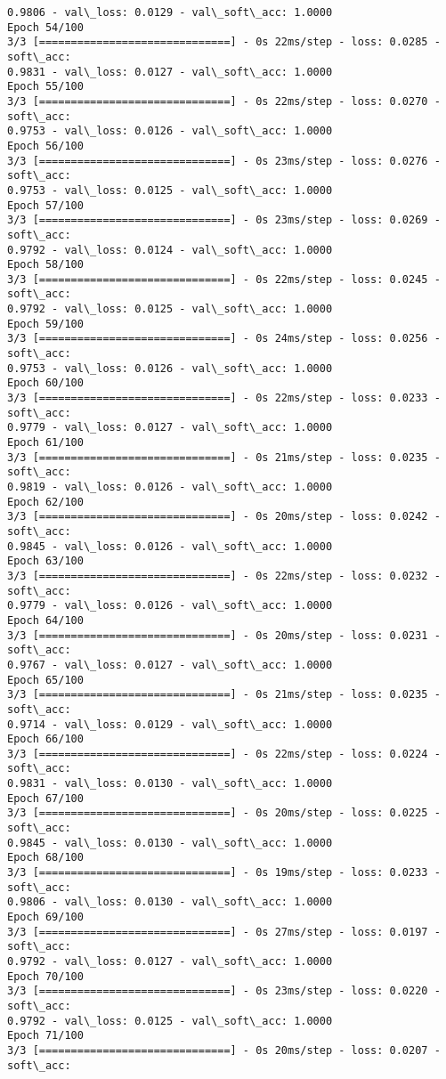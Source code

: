 \documentclass[11pt]{article}
\begin{document}
\begin{Verbatim}[commandchars=\\\{\}]
0.9806 - val\_loss: 0.0129 - val\_soft\_acc: 1.0000
Epoch 54/100
3/3 [==============================] - 0s 22ms/step - loss: 0.0285 - soft\_acc:
0.9831 - val\_loss: 0.0127 - val\_soft\_acc: 1.0000
Epoch 55/100
3/3 [==============================] - 0s 22ms/step - loss: 0.0270 - soft\_acc:
0.9753 - val\_loss: 0.0126 - val\_soft\_acc: 1.0000
Epoch 56/100
3/3 [==============================] - 0s 23ms/step - loss: 0.0276 - soft\_acc:
0.9753 - val\_loss: 0.0125 - val\_soft\_acc: 1.0000
Epoch 57/100
3/3 [==============================] - 0s 23ms/step - loss: 0.0269 - soft\_acc:
0.9792 - val\_loss: 0.0124 - val\_soft\_acc: 1.0000
Epoch 58/100
3/3 [==============================] - 0s 22ms/step - loss: 0.0245 - soft\_acc:
0.9792 - val\_loss: 0.0125 - val\_soft\_acc: 1.0000
Epoch 59/100
3/3 [==============================] - 0s 24ms/step - loss: 0.0256 - soft\_acc:
0.9753 - val\_loss: 0.0126 - val\_soft\_acc: 1.0000
Epoch 60/100
3/3 [==============================] - 0s 22ms/step - loss: 0.0233 - soft\_acc:
0.9779 - val\_loss: 0.0127 - val\_soft\_acc: 1.0000
Epoch 61/100
3/3 [==============================] - 0s 21ms/step - loss: 0.0235 - soft\_acc:
0.9819 - val\_loss: 0.0126 - val\_soft\_acc: 1.0000
Epoch 62/100
3/3 [==============================] - 0s 20ms/step - loss: 0.0242 - soft\_acc:
0.9845 - val\_loss: 0.0126 - val\_soft\_acc: 1.0000
Epoch 63/100
3/3 [==============================] - 0s 22ms/step - loss: 0.0232 - soft\_acc:
0.9779 - val\_loss: 0.0126 - val\_soft\_acc: 1.0000
Epoch 64/100
3/3 [==============================] - 0s 20ms/step - loss: 0.0231 - soft\_acc:
0.9767 - val\_loss: 0.0127 - val\_soft\_acc: 1.0000
Epoch 65/100
3/3 [==============================] - 0s 21ms/step - loss: 0.0235 - soft\_acc:
0.9714 - val\_loss: 0.0129 - val\_soft\_acc: 1.0000
Epoch 66/100
3/3 [==============================] - 0s 22ms/step - loss: 0.0224 - soft\_acc:
0.9831 - val\_loss: 0.0130 - val\_soft\_acc: 1.0000
Epoch 67/100
3/3 [==============================] - 0s 20ms/step - loss: 0.0225 - soft\_acc:
0.9845 - val\_loss: 0.0130 - val\_soft\_acc: 1.0000
Epoch 68/100
3/3 [==============================] - 0s 19ms/step - loss: 0.0233 - soft\_acc:
0.9806 - val\_loss: 0.0130 - val\_soft\_acc: 1.0000
Epoch 69/100
3/3 [==============================] - 0s 27ms/step - loss: 0.0197 - soft\_acc:
0.9792 - val\_loss: 0.0127 - val\_soft\_acc: 1.0000
Epoch 70/100
3/3 [==============================] - 0s 23ms/step - loss: 0.0220 - soft\_acc:
0.9792 - val\_loss: 0.0125 - val\_soft\_acc: 1.0000
Epoch 71/100
3/3 [==============================] - 0s 20ms/step - loss: 0.0207 - soft\_acc:

\end{Verbatim}
\end{document}
